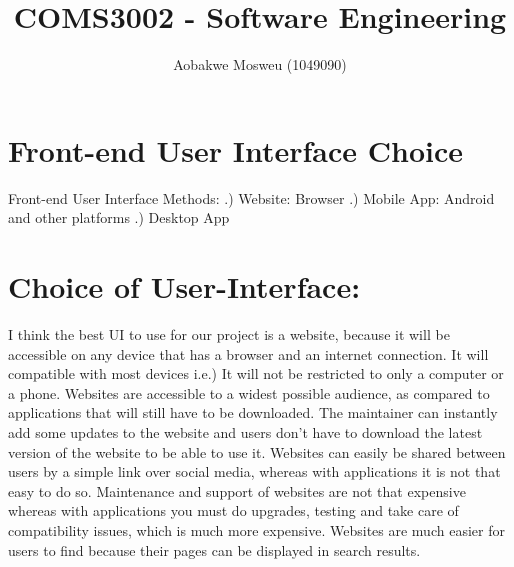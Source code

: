 \documentclass[11pt]{article}
\begin{document}
	\title{COMS3002 - Software Engineering}
	\author{Aobakwe Mosweu (1049090)}
	\maketitle
\section{Front-end User Interface Choice}

	Front-end User Interface Methods:
	.) Website: Browser
	.) Mobile App:  Android and other platforms
	.) Desktop App


\section{Choice of User-Interface:}
	I think the best UI to use for our project is a website, because it will be accessible on any device that has a browser and an internet connection. It will compatible with most devices i.e.) It will not be restricted to only a computer or a phone.
	\newline\newline
	Websites are accessible to a widest possible audience, as compared to applications that will still have to be downloaded. The maintainer can instantly add some updates to the website and users don't have to download the latest version of the website to be able to use it. 
	\newline\newline
	Websites can easily be shared between users by a simple link over social media, whereas with applications it is not that easy to do so.
	\newline\newline
	Maintenance and support of websites are not that expensive whereas with applications you must do upgrades, testing and take care of compatibility issues, which is much more expensive.
	\newline\newline
	Websites are much easier for users to find because their pages can be displayed in search results.
	
\end{document}
